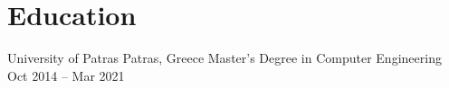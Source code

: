 \section{Education}

\begin{cventries}
    \cventryiv
        {University of Patras}
        {Patras, Greece}
        {Master's Degree in Computer Engineering}
        {Oct 2014 -- Mar 2021}
\end{cventries}
